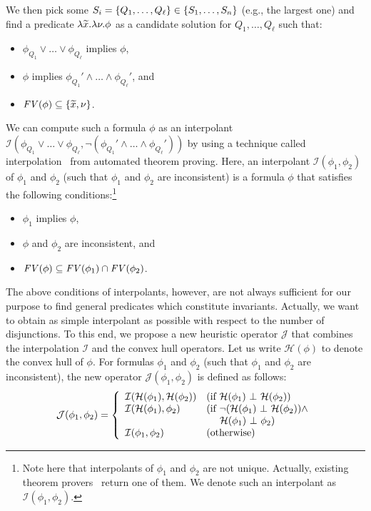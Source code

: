 We then pick some \(S_i = \{{Q_1,\dots,Q_{\ell}}\} \in
\{{S_1,\dots,S_n}\}\) (e.g., the largest one) and find a predicate
\(\lambda\widetilde{x}.\lambda \nu.\phi\) as a candidate solution for
\(Q_1,\dots,Q_{\ell}\) such that:
\begin{itemize}
\item \(\phi_{Q_1} \lor \dots \lor \phi_{Q_{\ell}}\) implies \(\phi\),
\item \(\phi\) implies \(\phi_{Q_1}' \land \dots \land \phi_{Q_{\ell}}'\), and
\item \(\mathit{FV}({\phi}) \subseteq \{{\widetilde{x},\nu}\}\).
\end{itemize}
We can compute such a formula \(\phi\) as an interpolant
\(\mathcal{I}(\phi_{Q_1} \lor \dots \lor \phi_{Q_{\ell}},\neg
(\phi_{Q_1}' \land \dots \land \phi_{Q_{\ell}}'))\) by using a technique
called interpolation~\cite{Henzinger2004,McMillan2005} from automated
theorem proving.  Here, an interpolant \(\mathcal{I}(\phi_1,\phi_2)\) of
\(\phi_1\) and \(\phi_2\) (such that \(\phi_1\) and \(\phi_2\) are
inconsistent) is a formula \(\phi\) that satisfies the following
conditions:\footnote{Note here that interpolants of \(\phi_1\) and
\(\phi_2\) are not unique.  Actually, existing theorem
provers~\cite{Henzinger2004,McMillan2005,Beyer2008} return one of them.
We denote such an interpolant as \(\mathcal{I}(\phi_1,\phi_2)\).}
\begin{itemize}
\item \(\phi_1\) implies \(\phi\),
\item \(\phi\) and \(\phi_2\) are inconsistent, and
\item \(\mathit{FV}({\phi}) \subseteq \mathit{FV}({\phi_1}) \cap \mathit{FV}({\phi_2})\).
\end{itemize}
The above conditions of interpolants, however, are not always sufficient
for our purpose to find general predicates which constitute invariants.
Actually, we want to obtain as simple interpolant as possible with
respect to the number of disjunctions.
To this end, we propose a new heuristic operator \(\mathcal{J}\) that
combines the interpolation \(\mathcal{I}\) and the convex hull operators.
 Let us write \(\mathcal{H}(\phi)\) to denote the convex hull of \(\phi\).
 For formulas \(\phi_1\) and \(\phi_2\) (such that \(\phi_1\) and
\(\phi_2\) are inconsistent), the new operator
\(\mathcal{J}(\phi_1,\phi_2)\) is defined as follows:
\begin{eqnarray*}
\mathcal{J}(\phi_1,\phi_2) =
\left\{
\begin{array}{ll}
\mathcal{I}(\mathcal{H}(\phi_1),\mathcal{H}(\phi_2)) & (\mbox{if~}\mathcal{H}(\phi_1) \ \bot\  \mathcal{H}(\phi_2)) \\
\mathcal{I}(\mathcal{H}(\phi_1),\phi_2) & (\mbox{if~}\neg (\mathcal{H}(\phi_1) \ \bot\  \mathcal{H}(\phi_2)) \land \\
&\ \quad \mathcal{H}(\phi_1) \ \bot\  \phi_2) \\
\mathcal{I}(\phi_1,\phi_2) & (\mbox{otherwise})
\end{array}
\right.
\end{eqnarray*}
